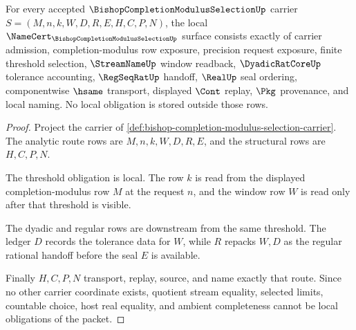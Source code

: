 \begin{theorem}
\label{thm:bishop-completion-modulus-selection-namecert-obligations}
For every accepted $\BishopCompletionModulusSelectionUp$ carrier $S=(M,n,k,W,D,R,E,H,C,P,N)$, the local $\NameCert_{\BishopCompletionModulusSelectionUp}$ surface consists exactly of carrier admission, completion-modulus row exposure, precision request exposure, finite threshold selection, $\StreamNameUp$ window readback, $\DyadicRatCoreUp$ tolerance accounting, $\RegSeqRatUp$ handoff, $\RealUp$ seal ordering, componentwise $\hsame$ transport, displayed $\Cont$ replay, $\Pkg$ provenance, and local naming. No local obligation is stored outside those rows.
\end{theorem}
\begin{proof}
Project the carrier of \autoref{def:bishop-completion-modulus-selection-carrier}. The analytic route rows are $M,n,k,W,D,R,E$, and the structural rows are $H,C,P,N$.

The threshold obligation is local. The row $k$ is read from the displayed completion-modulus row $M$ at the request $n$, and the window row $W$ is read only after that threshold is visible.

The dyadic and regular rows are downstream from the same threshold. The ledger $D$ records the tolerance data for $W$, while $R$ repacks $W,D$ as the regular rational handoff before the seal $E$ is available.

Finally $H,C,P,N$ transport, replay, source, and name exactly that route. Since no other carrier coordinate exists, quotient stream equality, selected limits, countable choice, host real equality, and ambient completeness cannot be local obligations of the packet.
\end{proof}

